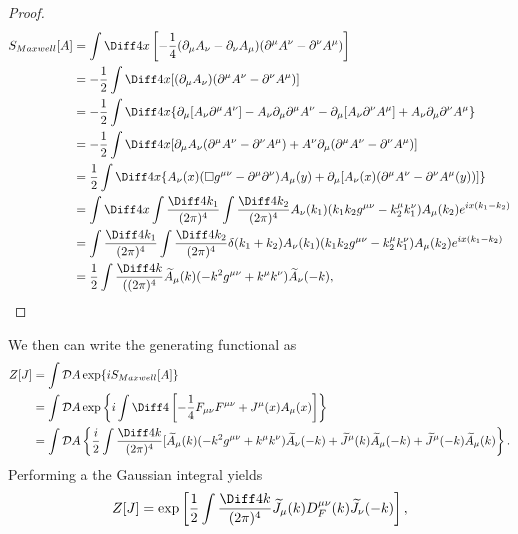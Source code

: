 \begin{proof}
\begin{align}
	S_{Maxwell} [A] &= \int \Diff4x \left[-\frac{1}{4} (\partial_\mu A_\nu - \partial_\nu A_\mu) (\partial^\mu A^\nu - \partial^\nu A^\mu) \right] \\
	&= -\frac{1}{2} \int \Diff4x [(\partial_\mu A_\nu)(\partial^\mu A^\nu - \partial^\nu A^\mu)] \\
	&= -\frac{1}{2} \int \Diff4x \{ \partial_\mu[A_\nu \partial^\mu A^\nu] - A_\nu \partial_\mu \partial^\mu A^\nu - \partial_\mu[A_\nu\partial^\nu A^\mu] + A_\nu \partial_\mu \partial^\nu A^\mu \} \\
	&= - \frac{1}{2} \int \Diff4x [ \partial_\mu A_\nu (\partial^\mu A^\nu - \partial^\nu A^\mu) + A^\nu \partial_\mu (\partial^\mu A^\nu - \partial^\nu A^\mu)] \\
	&= \frac{1}{2} \int \Diff4x \{ A_\nu(x) (\square g^{\mu\nu} - \partial^\mu\partial^\nu)A_\mu(y) + \partial_\mu[A_\nu(x) (\partial^\mu A^\nu - \partial^\nu A^\mu(y)) ]\} \\
	&= \int\Diff4x \int\frac{\Diff4k_1}{(2\pi)^4} \int\frac{\Diff4k_2}{(2\pi)^4} A_\nu(k_1) (k_1 k_2 g^{\mu\nu} - k_2^\mu k_1^\nu)A_\mu(k_2) e^{ix(k_1-k_2)} \\
	&= \int \frac{\Diff4k_1}{(2\pi)^4}\int\frac{\Diff4k_2}{(2\pi)^4} \delta(k_1+k_2)  A_\nu(k_1) (k_1 k_2 g^{\mu\nu} - k_2^\mu k_1^\nu)A_\mu(k_2) e^{ix(k_1-k_2)} \\
	&=  \frac{1}{2} \int \frac{\Diff4k}{((2\pi)^4} \widetilde{A}_\mu(k) (-k^2 g^{\mu\nu} + k^\mu k^\nu) \widetilde{A}_\nu(-k),
\end{align}
\end{proof}
We then can write the generating functional as
\begin{align}
	Z[J] &= \int\mathcal{D}A \exp\{i S_{Maxwell}[A]\} \\
		&= \int\mathcal{D}A \exp \left\{i \int\Diff4\left[-\frac{1}{4}F_{\mu\nu}F^{\mu\nu} + J^\mu(x)A_\mu(x)\right]\right\} \\
    		&= \int\mathcal{D}A \left\{\frac{i}{2} \int\frac{\Diff4k}{(2\pi)^4} [ \widetilde{A}_\mu(k) (-k^2 g^{\mu\nu} + k^\mu k^\nu ) \widetilde A_\nu (-k) + \widetilde{J}^\mu(k) \widetilde{A}_\mu (-k) + \widetilde{J}^\mu(-k) \widetilde{A}_\mu(k) \right\}.
\end{align}
Performing a the Gaussian integral yields
\begin{equation}
	Z[J] = \exp\left[\frac{1}{2} \int \frac{\Diff4k}{(2\pi)^4} \widetilde{J}_\mu(k) D^{\mu\nu}_F(k) \widetilde{J}_\nu (-k) \right],
\end{equation}
